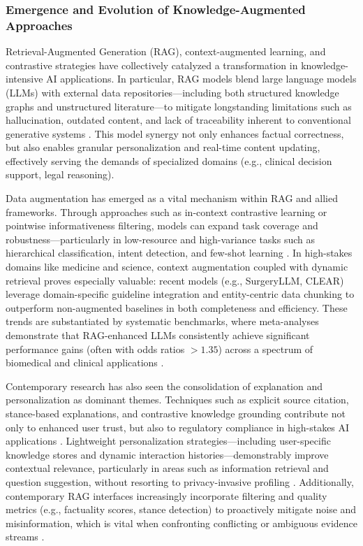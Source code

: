 \documentclass[sigconf]{acmart}
\begin{document}
\subsubsection{Emergence and Evolution of Knowledge-Augmented Approaches}

Retrieval-Augmented Generation (RAG), context-augmented learning, and contrastive strategies have collectively catalyzed a transformation in knowledge-intensive AI applications. In particular, RAG models blend large language models (LLMs) with external data repositories—including both structured knowledge graphs and unstructured literature—to mitigate longstanding limitations such as hallucination, outdated content, and lack of traceability inherent to conventional generative systems \cite{ref4,ref14,ref15,ref28,ref36,ref54,ref61,ref62,ref63,ref64}. This model synergy not only enhances factual correctness, but also enables granular personalization and real-time content updating, effectively serving the demands of specialized domains (e.g., clinical decision support, legal reasoning).

Data augmentation has emerged as a vital mechanism within RAG and allied frameworks. Through approaches such as in-context contrastive learning or pointwise informativeness filtering, models can expand task coverage and robustness—particularly in low-resource and high-variance tasks such as hierarchical classification, intent detection, and few-shot learning \cite{ref8,ref10,ref16,ref19,ref26,ref29,ref35,ref47,ref55,ref63}. In high-stakes domains like medicine and science, context augmentation coupled with dynamic retrieval proves especially valuable: recent models (e.g., SurgeryLLM, CLEAR) leverage domain-specific guideline integration and entity-centric data chunking to outperform non-augmented baselines in both completeness and efficiency. These trends are substantiated by systematic benchmarks, where meta-analyses demonstrate that RAG-enhanced LLMs consistently achieve significant performance gains (often with odds ratios $>1.35$) across a spectrum of biomedical and clinical applications \cite{ref8}.

Contemporary research has also seen the consolidation of explanation and personalization as dominant themes. Techniques such as explicit source citation, stance-based explanations, and contrastive knowledge grounding contribute not only to enhanced user trust, but also to regulatory compliance in high-stakes AI applications \cite{ref17,ref43,ref46,ref54,ref62}. Lightweight personalization strategies—including user-specific knowledge stores and dynamic interaction histories—demonstrably improve contextual relevance, particularly in areas such as information retrieval and question suggestion, without resorting to privacy-invasive profiling \cite{ref23,ref45,ref48}. Additionally, contemporary RAG interfaces increasingly incorporate filtering and quality metrics (e.g., factuality scores, stance detection) to proactively mitigate noise and misinformation, which is vital when confronting conflicting or ambiguous evidence streams \cite{ref21,ref22,ref28,ref32,ref42,ref46,ref50,ref52}.
\end{document}

